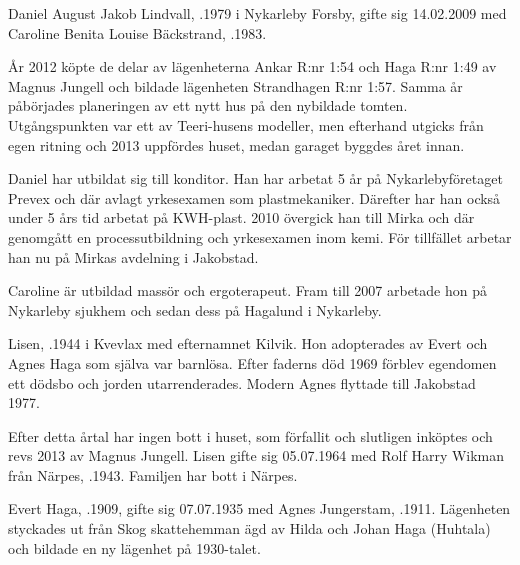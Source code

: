 


Daniel August Jakob Lindvall, .1979 i Nykarleby Forsby, gifte sig 14.02.2009 med Caroline Benita Louise Bäckstrand, .1983.

År 2012 köpte de delar av lägenheterna Ankar R:nr 1:54 och Haga R:nr 1:49 av Magnus Jungell och bildade lägenheten Strandhagen R:nr 1:57. Samma år påbörjades planeringen av ett nytt hus på den nybildade tomten. Utgångspunkten var ett av Teeri-husens modeller, men efterhand utgicks från egen ritning och 2013 uppfördes huset, medan garaget byggdes året innan.

Daniel har utbildat sig till konditor. Han har arbetat 5 år på Nykarlebyföretaget Prevex och där avlagt yrkesexamen som plastmekaniker. Därefter har han också under 5 års tid arbetat på KWH-plast. 2010 övergick han till Mirka  och där genomgått en processutbildning och yrkesexamen inom kemi. För tillfället arbetar han nu på Mirkas avdelning i Jakobstad.

Caroline är utbildad massör och ergoterapeut. Fram till 2007 arbetade hon på Nykarleby sjukhem och sedan dess på Hagalund i Nykarleby.

\begin{jhchildren}
  \item {}
  \item {}
\end{jhchildren}





Lisen, .1944 i Kvevlax med efternamnet Kilvik. Hon adopterades av Evert och Agnes Haga som själva var barnlösa. Efter faderns död 1969 förblev egendomen ett dödsbo och jorden utarrenderades. Modern Agnes flyttade till Jakobstad 1977.

Efter detta årtal har ingen bott i huset, som förfallit och slutligen inköptes och revs 2013 av Magnus Jungell. Lisen gifte sig 05.07.1964 med Rolf Harry Wikman från Närpes, .1943. Familjen har bott i Närpes.


Evert Haga, .1909, gifte sig 07.07.1935  med Agnes Jungerstam, .1911. Lägenheten styckades ut från Skog skattehemman ägd av Hilda och Johan Haga (Huhtala) och bildade en  ny lägenhet på 1930-talet.

